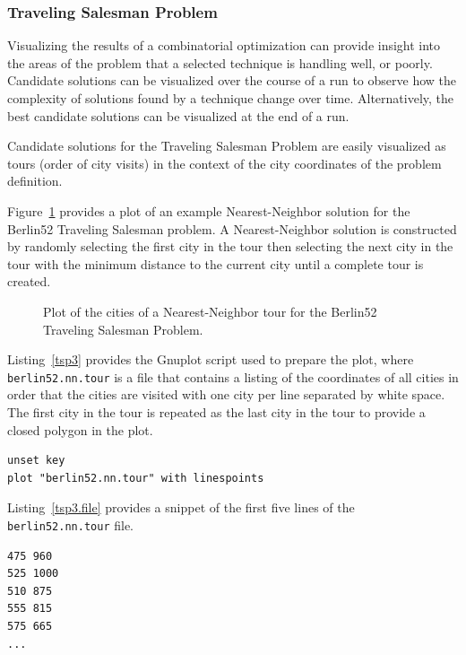 \subsubsection{Traveling Salesman Problem}
Visualizing the results of a combinatorial optimization can provide insight into the areas of the problem that a selected technique is handling well, or  poorly.
Candidate solutions can be visualized over the course of a run to observe how the complexity of solutions found by a technique change over time. Alternatively, the best candidate solutions can be visualized at the end of a run. 

Candidate solutions for the Traveling Salesman Problem are easily visualized as tours (order of city visits) in the context of the city coordinates of the problem definition.

Figure~\ref{plot:tsp3} provides a plot of an example Nearest-Neighbor solution for the Berlin52 Traveling Salesman problem. A Nearest-Neighbor solution is constructed by randomly selecting the first city in the tour then selecting the next city in the tour with the minimum distance to the current city until a complete tour is created. 

\begin{figure}[htp]
\centering

\caption{Plot of the cities of a Nearest-Neighbor tour for the Berlin52 Traveling Salesman Problem.}
\label{plot:tsp3}
\end{figure}

Listing~\ref{tsp3} provides the Gnuplot script used to prepare the plot, where \texttt{berlin52.nn.tour} is a file that contains a listing of the coordinates of all cities in order that the cities are visited with one city per line separated by white space. The first city in the tour is repeated as the last city in the tour to provide a closed polygon in the plot.

\begin{lstlisting}[caption=Gnuplot script for plotting a tour for a Traveling Salesman Problem., label=tsp3]
unset key
plot "berlin52.nn.tour" with linespoints
\end{lstlisting}

Listing~\ref{tsp3.file} provides a snippet of the first five lines of the \texttt{berlin52.nn.tour} file.

\begin{lstlisting}[caption=Snippet of the berlin52.nn.tour file., label=tsp3.file]
475 960
525 1000
510 875
555 815
575 665
...
\end{lstlisting}

